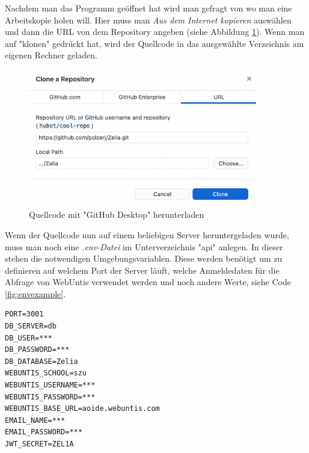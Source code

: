 \begin{minipage}{\textwidth}
    
    Nachdem man das Programm geöffnet hat wird man gefragt von wo man eine Arbeitskopie holen will. Hier muss man \emph{Aus dem Internet kopieren} auswählen und dann die URL von dem Repository angeben (siehe Abbildung \ref{fig:clonewithdesktop}). Wenn man auf "klonen" gedrückt hat, wird der Quellcode in das ausgewählte Verzeichnis am eigenen Rechner geladen. 
    
    \begin{figure}[H]
        \centering
        \includegraphics[width=100mm]{media/Handbuch/clone_gh.png}
        \caption{Quellcode mit "GitHub Desktop" herunterladen}
        \label{fig:clonewithdesktop}
    \end{figure}
\end{minipage}



Wenn der Quellcode nun auf einem beliebigen Server heruntergeladen wurde, muss man noch eine \emph{.env-Datei} im Unterverzeichnis "api" anlegen. In dieser stehen die notwendigen Umgebungsvariablen. Diese werden benötigt um zu definieren auf welchem Port der Server läuft, welche Anmeldedaten für die Abfrage von WebUntis verwendet werden und noch andere Werte, siehe Code \ref{fig:envexample}.


\begin{singlespace}
    \begin{lstlisting}[caption={Beispiel einer .env-Datei},label={fig:envexample},captionpos=b]
PORT=3001
DB_SERVER=db
DB_USER=***
DB_PASSWORD=***
DB_DATABASE=Zelia
WEBUNTIS_SCHOOL=szu
WEBUNTIS_USERNAME=***
WEBUNTIS_PASSWORD=***
WEBUNTIS_BASE_URL=aoide.webuntis.com
EMAIL_NAME=***
EMAIL_PASSWORD=***
JWT_SECRET=ZEL1A
    \end{lstlisting}
\end{singlespace}

